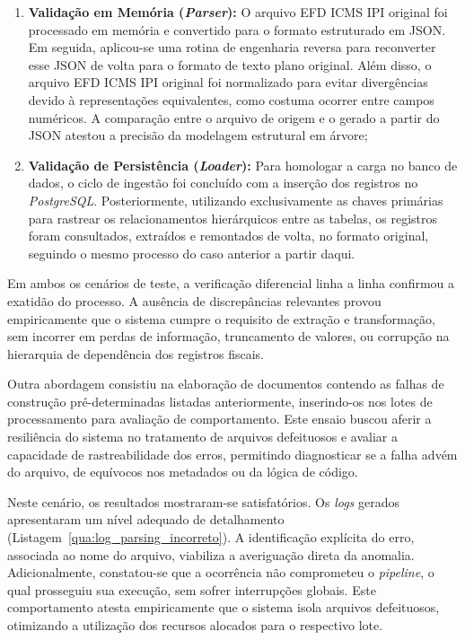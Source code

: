 \begin{enumerate}
    \item \textbf{Validação em Memória (\textit{Parser}):} O arquivo
    EFD ICMS IPI original foi processado em memória e convertido para o formato
    estruturado em JSON. Em seguida, aplicou-se uma rotina de engenharia
    reversa para reconverter esse JSON de volta para o formato de texto plano
    original. Além disso, o arquivo EFD ICMS IPI original foi normalizado para
    evitar divergências devido à representações equivalentes, como costuma
    ocorrer entre campos numéricos. A comparação entre o arquivo de origem e o
    gerado a partir do JSON atestou a precisão da modelagem estrutural
    em árvore;
    \item \textbf{Validação de Persistência (\textit{Loader}):} Para homologar
    a carga no banco de dados, o ciclo de ingestão foi concluído com a inserção
    dos registros no \textit{PostgreSQL}. Posteriormente, utilizando
    exclusivamente as chaves primárias para rastrear os relacionamentos
    hierárquicos entre as tabelas, os registros foram consultados, extraídos
    e remontados de volta, no formato original, seguindo o mesmo processo do
    caso anterior a partir daqui.
\end{enumerate}

Em ambos os cenários de teste, a verificação diferencial linha a linha confirmou
a exatidão do processo. A ausência de discrepâncias relevantes provou
empiricamente que o sistema cumpre o requisito de extração e transformação,
sem incorrer em perdas de informação, truncamento de valores, ou corrupção na
hierarquia de dependência dos registros fiscais.

Outra abordagem consistiu na elaboração de documentos contendo as falhas de
construção pré-determinadas listadas anteriormente, inserindo-os nos lotes de
processamento para avaliação de comportamento. Este ensaio buscou aferir a
resiliência do sistema no tratamento de arquivos defeituosos e avaliar a
capacidade de rastreabilidade dos erros, permitindo diagnosticar se a falha
advém do arquivo, de equívocos nos metadados ou da lógica de código.

Neste cenário, os resultados mostraram-se satisfatórios. Os \textit{logs}
gerados apresentaram um nível adequado de detalhamento
(Listagem~\ref{qua:log_parsing_incorreto}). A identificação explícita do erro,
associada ao nome do arquivo, viabiliza a averiguação direta da anomalia.
Adicionalmente, constatou-se que a ocorrência não comprometeu o
\textit{pipeline}, o qual prosseguiu sua execução, sem sofrer interrupções
globais. Este comportamento atesta empiricamente que o sistema isola arquivos
defeituosos, otimizando a utilização dos recursos alocados para o
respectivo lote.

